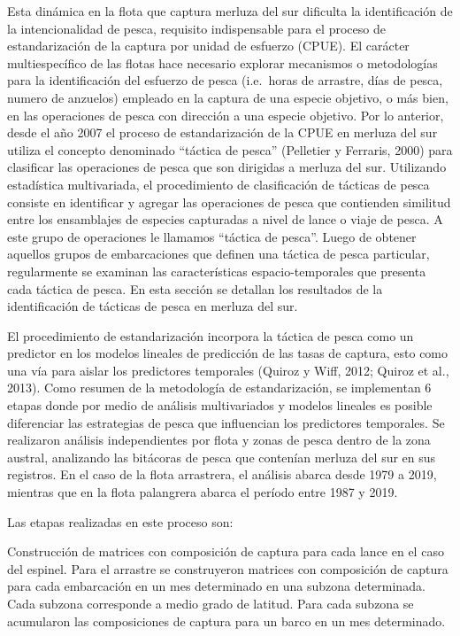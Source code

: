 \documentclass[
  spanish,
]{article}
\begin{document}
Esta dinámica en la flota que captura merluza del sur dificulta la
identificación de la intencionalidad de pesca, requisito indispensable
para el proceso de estandarización de la captura por unidad de esfuerzo
(CPUE). El carácter multiespecífico de las flotas hace necesario
explorar mecanismos o metodologías para la identificación del esfuerzo
de pesca (i.e.~horas de arrastre, días de pesca, numero de anzuelos)
empleado en la captura de una especie objetivo, o más bien, en las
operaciones de pesca con dirección a una especie objetivo. Por lo
anterior, desde el año 2007 el proceso de estandarización de la CPUE en
merluza del sur utiliza el concepto denominado ``táctica de pesca''
(Pelletier y Ferraris, 2000) para clasificar las operaciones de pesca
que son dirigidas a merluza del sur. Utilizando estadística
multivariada, el procedimiento de clasificación de tácticas de pesca
consiste en identificar y agregar las operaciones de pesca que
contienden similitud entre los ensamblajes de especies capturadas a
nivel de lance o viaje de pesca. A este grupo de operaciones le llamamos
``táctica de pesca''. Luego de obtener aquellos grupos de embarcaciones
que definen una táctica de pesca particular, regularmente se examinan
las características espacio-temporales que presenta cada táctica de
pesca. En esta sección se detallan los resultados de la identificación
de tácticas de pesca en merluza del sur.

El procedimiento de estandarización incorpora la táctica de pesca como
un predictor en los modelos lineales de predicción de las tasas de
captura, esto como una vía para aislar los predictores temporales
(Quiroz y Wiff, 2012; Quiroz et al., 2013). Como resumen de la
metodología de estandarización, se implementan 6 etapas donde por medio
de análisis multivariados y modelos lineales es posible diferenciar las
estrategias de pesca que influencian los predictores temporales. Se
realizaron análisis independientes por flota y zonas de pesca dentro de
la zona austral, analizando las bitácoras de pesca que contenían merluza
del sur en sus registros. En el caso de la flota arrastrera, el análisis
abarca desde 1979 a 2019, mientras que en la flota palangrera abarca el
período entre 1987 y 2019.

Las etapas realizadas en este proceso son:

Construcción de matrices con composición de captura para cada lance en
el caso del espinel. Para el arrastre se construyeron matrices con
composición de captura para cada embarcación en un mes determinado en
una subzona determinada. Cada subzona corresponde a medio grado de
latitud. Para cada subzona se acumularon las composiciones de captura
para un barco en un mes determinado.
\end{document}
